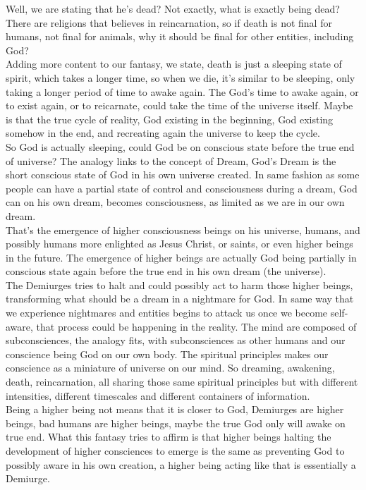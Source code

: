 \documentclass[12pt,a4paper]{article}
\begin{document}
Well, we are stating that he's dead? Not exactly, what is exactly being dead? There are religions that believes in reincarnation, so if death is not final for humans, not final for animals, why it should be final for other entities, including God?\\

Adding more content to our fantasy, we state, death is just a sleeping state of spirit, which takes a longer time, so when we die, it's similar to be sleeping, only taking a longer period of time to awake again. The God's time to awake again, or to exist again, or to reicarnate, could take the time of the universe itself. Maybe is that the true cycle of reality, God existing in the beginning, God existing somehow in the end, and recreating again the universe to keep the cycle.\\

So God is actually sleeping, could God be on conscious state before the true end of universe? The analogy links to the concept of Dream, God's Dream is the short conscious state of God in his own universe created. In same fashion as some people can have a partial state of control and consciousness during a dream, God can on his own dream, becomes consciousness, as limited as we are in our own dream.\\

That's the emergence of higher consciousness beings on his universe, humans, and possibly humans more enlighted as Jesus Christ, or saints, or even higher beings in the future. The emergence of higher beings are actually God being partially in conscious state again before the true end in his own dream (the universe). \\

The Demiurges tries to halt and could possibly act to harm those higher beings, transforming what should be a dream in a nightmare for God. In same way that we experience nightmares and entities begins to attack us once we become self-aware, that process could be happening in the reality. The mind are composed of subconsciences, the analogy fits, with subconsciences as other humans and our conscience being God on our own body. The spiritual principles makes our conscience as a miniature of universe on our mind. So dreaming, awakening, death, reincarnation, all sharing those same spiritual principles but with different intensities, different timescales and different containers of information.\\

Being a higher being not means that it is closer to God, Demiurges are higher beings, bad humans are higher beings, maybe the true God only will awake on true end. What this fantasy tries to affirm is that higher beings halting the development of higher consciences to emerge is the same as preventing God to possibly aware in his own creation, a higher being acting like that is essentially a Demiurge.\\
\end{document}
